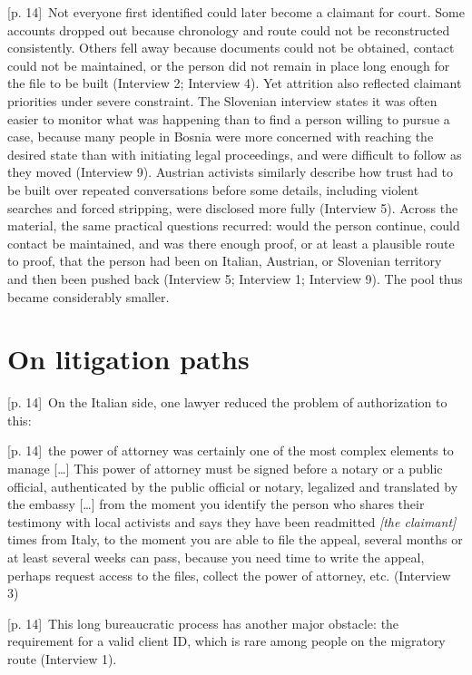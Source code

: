 \documentclass[10pt,a4paper]{article}
\begin{document}
{\scriptsize\color{gray} [p. 14]}\ Not everyone first identified could later become a claimant for court. Some accounts dropped out because chronology and route could not be reconstructed consistently. Others fell away because documents could not be obtained, contact could not be maintained, or the person did not remain in place long enough for the file to be built (Interview 2; Interview 4). Yet attrition also reflected claimant priorities under severe constraint. The Slovenian interview states it was often easier to monitor what was happening than to find a person willing to pursue a case, because many people in Bosnia were more concerned with reaching the desired state than with initiating legal proceedings, and were difficult to follow as they moved (Interview 9). Austrian activists similarly describe how trust had to be built over repeated conversations before some details, including violent searches and forced stripping, were disclosed more fully (Interview 5). Across the material, the same practical questions recurred: would the person continue, could contact be maintained, and was there enough proof, or at least a plausible route to proof, that the person had been on Italian, Austrian, or Slovenian territory and then been pushed back (Interview 5; Interview 1; Interview 9). The pool thus became considerably smaller.\par
{}\section*{On litigation paths}
{\scriptsize\color{gray} [p. 14]}\ On the Italian side, one lawyer reduced the problem of authorization to this:\par
{\scriptsize\color{gray} [p. 14]}\ the power of attorney was certainly one of the most complex elements to manage […] This power of attorney must be signed before a notary or a public official, authenticated by the public official or notary, legalized and translated by the embassy […] from the moment you identify the person who shares their testimony with local activists and says they have been readmitted \textit{[the claimant]} times from Italy, to the moment you are able to file the appeal, several months or at least several weeks can pass, because you need time to write the appeal, perhaps request access to the files, collect the power of attorney, etc. (Interview 3)\par
{\scriptsize\color{gray} [p. 14]}\ This long bureaucratic process has another major obstacle: the requirement for a valid client ID, which is rare among people on the migratory route (Interview 1).\par
\end{document}
